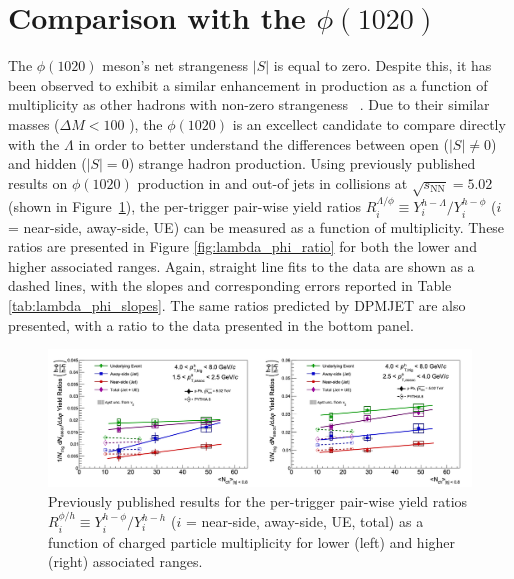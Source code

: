 \section{Comparison with the $\phi(1020)$}
\label{sec:phi_comparison}

The $\phi(1020)$ meson's net strangeness $|S|$ is equal to zero. Despite this, it has been observed to exhibit a similar enhancement in production as a function of multiplicity as other hadrons with non-zero strangeness ~\cite{PhiEnhancement}. Due to their similar masses ($\Delta M < 100$ \MeVmass), the $\phi(1020)$ is an excellect candidate to compare directly with the $\Lambda$ in order to better understand the differences between open ($|S| \neq 0$) and hidden ($|S| = 0$) strange hadron production. Using previously published results on $\phi(1020)$ production in and out-of jets in \pPb collisions at $\sqrt{s_{\text{NN}}} = 5.02$ \TeV ~\cite{JustinPaper} (shown in Figure~\ref{fig:justin_plots}), the per-trigger pair-wise yield ratios $R_{i}^{\Lambda/\phi} \equiv Y_{i}^{h-\Lambda}/Y_{i}^{h-\phi}$ ($i$ = near-side, away-side, UE) can be measured as a function of multiplicity. These ratios are presented in Figure \ref{fig:lambda_phi_ratio} for both the lower and higher associated \pt ranges. Again, straight line fits to the data are shown as a dashed lines, with the slopes and corresponding errors reported in Table \ref{tab:lambda_phi_slopes}. The same ratios predicted by DPMJET are also presented, with a ratio to the data presented in the bottom panel.

\begin{figure}[h!]
\centering
\includegraphics[width=\textwidth]{figures/results/justin_plots.png}
\caption{Previously published results for the per-trigger pair-wise yield ratios $R_{i}^{\phi/h} \equiv Y_{i}^{h-\phi}/Y_{i}^{h-h}$ ($i$ = near-side, away-side, UE, total) as a function of charged particle multiplicity for lower (left) and higher (right) associated \pt ranges.}
\label{fig:justin_plots}
\end{figure}

